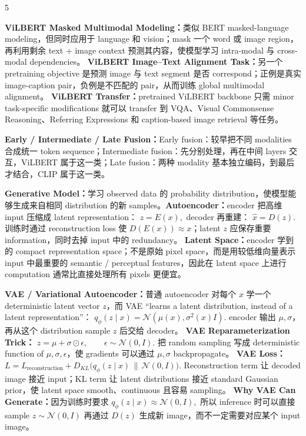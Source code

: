\documentclass[a4paper, landscape]{article}
\begin{document}
\begin{multicols}{5}
\par \textbf{ViLBERT Masked Multimodal Modeling：}类似 BERT masked-language modeling，但同时应用于 language 和 vision；mask 一个 word 或 image region，再利用剩余 text + image context 预测其内容，使模型学习 intra-modal 与 cross-modal dependencies。
\textbf{ViLBERT Image--Text Alignment Task：}另一个 pretraining objective 是预测 image 与 text segment 是否 correspond；正例是真实 image-caption pair，负例是不匹配的 pair，从而训练 global multimodal alignment。
\textbf{ViLBERT Transfer：}pretrained ViLBERT backbone 只需 minor task-specific modifications 就可以 transfer 到 VQA、Visual Commonsense Reasoning、Referring Expressions 和 caption-based image retrieval 等任务。

\par \textbf{Early / Intermediate / Late Fusion：}Early fusion：较早把不同 modalities 合成统一 token sequence；Intermediate fusion：先分别处理，再在中间 layers 交互，ViLBERT 属于这一类；Late fusion：两种 modality 基本独立编码，到最后才结合，CLIP 属于这一类。

\par \textbf{Generative Model：}学习 observed data 的 probability distribution，使模型能够生成来自相同 distribution 的新 samples。\textbf{Autoencoder：}encoder 把高维 input 压缩成 latent representation：
\(
z=E(x),
\)
decoder 再重建：
\(
\hat x=D(z).
\)
训练时通过 reconstruction loss 使 \(D(E(x))\approx x\)；latent \(z\) 应保存重要 information，同时去掉 input 中的 redundancy。
\textbf{Latent Space：}encoder 学到的 compact representation space；不是原始 pixel space，而是用较低维向量表示 input 中最重要的 semantic / perceptual features，因此在 latent space 上进行 computation 通常比直接处理所有 pixels 更便宜。

\par \textbf{VAE / Variational Autoencoder：}普通 autoencoder 对每个 \(x\) 学一个 deterministic latent vector \(z\)，而 VAE ``learns a latent distribution, instead of a latent representation''：
\(
q_\phi(z\mid x)
=
\mathcal N(\mu(x),\sigma^2(x)I).
\)
encoder 输出 \(\mu,\sigma\)，再从这个 distribution sample \(z\) 后交给 decoder。
\textbf{VAE Reparameterization Trick：}
\(
z=\mu+\sigma\odot\epsilon,
\qquad
\epsilon\sim\mathcal N(0,I).
\)
把 random sampling 写成 deterministic function of \(\mu,\sigma,\epsilon\)，使 gradients 可以通过 \(\mu,\sigma\) backpropagate。
\textbf{VAE Loss：}
\(
L
=
L_{\mathrm{reconstruction}}
+
D_{KL}
\big(q_\phi(z\mid x)\,\|\,\mathcal N(0,I)\big).
\)
Reconstruction term 让 decoded image 接近 input；KL term 让 latent distributions 接近 standard Gaussian prior，使 latent space smooth、continuous 且容易 sampling。
\textbf{Why VAE Can Generate：}因为训练时要求
\(
q_\phi(z\mid x)\approx\mathcal N(0,I),
\)
所以 inference 时可以直接 sample
\(
z\sim\mathcal N(0,I)
\)
再通过 \(D(z)\) 生成新 image，而不一定需要对应某个 input image。


\end{multicols}
\end{document}
